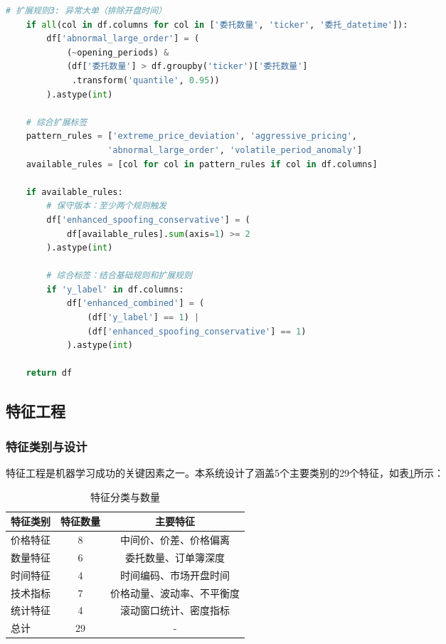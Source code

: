 \documentclass[12pt,a4paper]{article}
\begin{document}
\begin{lstlisting}[language=Python, caption=扩展标签生成代码]
    # 扩展规则3: 异常大单（排除开盘时间）
    if all(col in df.columns for col in ['委托数量', 'ticker', '委托_datetime']):
        df['abnormal_large_order'] = (
            (~opening_periods) &
            (df['委托数量'] > df.groupby('ticker')['委托数量']
             .transform('quantile', 0.95))
        ).astype(int)
    
    # 综合扩展标签
    pattern_rules = ['extreme_price_deviation', 'aggressive_pricing', 
                    'abnormal_large_order', 'volatile_period_anomaly']
    available_rules = [col for col in pattern_rules if col in df.columns]
    
    if available_rules:
        # 保守版本：至少两个规则触发
        df['enhanced_spoofing_conservative'] = (
            df[available_rules].sum(axis=1) >= 2
        ).astype(int)
        
        # 综合标签：结合基础规则和扩展规则
        if 'y_label' in df.columns:
            df['enhanced_combined'] = (
                (df['y_label'] == 1) | 
                (df['enhanced_spoofing_conservative'] == 1)
            ).astype(int)
    
    return df
\end{lstlisting}

\subsection{特征工程}

\subsubsection{特征类别与设计}

特征工程是机器学习成功的关键因素之一。本系统设计了涵盖5个主要类别的29个特征，如表\ref{tab:feature_categories}所示：

\begin{table}[H]
\centering
\caption{特征分类与数量}
\label{tab:feature_categories}
\begin{tabular}{lcc}
\toprule
特征类别 & 特征数量 & 主要特征 \\
\midrule
价格特征 & 8 & 中间价、价差、价格偏离 \\
数量特征 & 6 & 委托数量、订单簿深度 \\
时间特征 & 4 & 时间编码、市场开盘时间 \\
技术指标 & 7 & 价格动量、波动率、不平衡度 \\
统计特征 & 4 & 滚动窗口统计、密度指标 \\
\toprule
总计 & 29 & - \\
\bottomrule
\end{tabular}
\end{table}
\end{document}
